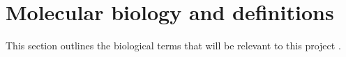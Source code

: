 \documentclass[12pt, twoside, a4paper]{report}
\begin{document}



\section{Molecular biology and definitions} \label{bg:bio}
This section outlines the biological terms that will be relevant to this project \cite{RefWorks:106, RefWorks:108, RefWorks:110, RefWorks:111}.
\end{document}
